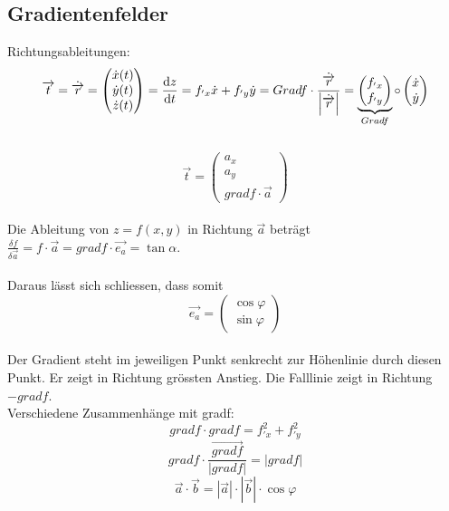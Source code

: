 \subsection{Gradientenfelder}
Richtungsableitungen:
\\
\[
	\overrightarrow{t}=\dot{\overrightarrow{r}}=
	\begin{pmatrix}
	 	\dot{x}(t)\\
		\dot{y}(t)\\
		\dot{z}(t)
	\end{pmatrix}
	=
	\frac{\mathrm{d} z}{\mathrm{d} t}=f_{'x}\dot x +f_{'y} \dot y
	=
	Gradf\cdot \frac{\dot{\overrightarrow{r}}}{\left| \dot{\overrightarrow{r}}\right| }
	=
	\underbrace{
		\begin{pmatrix}
				 	f_{'x}\\
					f_{'y}
			\end{pmatrix}
	}_{Gradf}
	\circ
	\begin{pmatrix}
			 	\dot x\\
				\dot y
		\end{pmatrix}	
\]
\\
\[
	\overrightarrow{t}=	
	\begin{pmatrix}
		a_x\\
		a_y\\
		grad f\cdot \overrightarrow{a}
	\end{pmatrix}
\]
\\
Die Ableitung von $z=f(x,y)$ in Richtung $	\overrightarrow{a}$ beträgt $\frac{\delta f}{\delta \overrightarrow{a}}= f\cdot \overrightarrow{a} = gradf\cdot\overrightarrow{e_a}=\tan\alpha$.
\\
\\
Daraus lässt sich schliessen, dass somit 
\[
	\overrightarrow{e_a}=	
	\begin{pmatrix}
		\cos\varphi\\
		\sin\varphi
	\end{pmatrix}
\]
\\
Der Gradient steht im jeweiligen Punkt senkrecht zur Höhenlinie durch diesen Punkt. Er zeigt in Richtung grössten Anstieg. Die Falllinie zeigt in Richtung $-grad f$.
\\
Verschiedene Zusammenhänge mit gradf:
\[
	gradf \cdot gradf = f_{'x}^2+f_{'y}^2
\]
\[
	gradf\cdot \frac{	\overrightarrow{gradf}}{|gradf|}=|gradf|
\]
\[
	\overrightarrow{a} \cdot	\overrightarrow{b} = 	|\overrightarrow{a}| \cdot	|\overrightarrow{b}|\cdot \cos \varphi
\]
